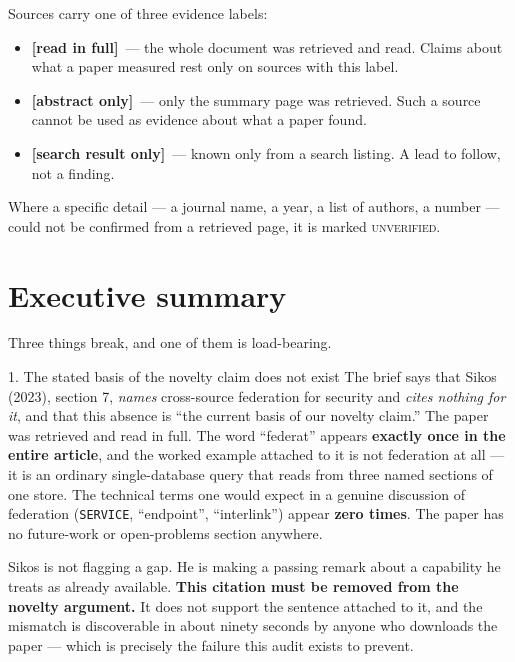 \documentclass[11pt,a4paper]{article}
\newcommand{\readtag}{\textcolor{standing}{\textbf{[read in full]}}}
\newcommand{\abstag}{\textcolor{partial}{\textbf{[abstract only]}}}
\newcommand{\sniptag}{\textcolor{killed}{\textbf{[search result only]}}}
\newcommand{\unver}{\textcolor{killed}{\textsc{unverified}}}
\begin{document}
\vspace{4mm}

Sources carry one of three evidence labels:

\begin{itemize}
\item \readtag\ --- the whole document was retrieved and read. Claims about what a
      paper measured rest only on sources with this label.
\item \abstag\ --- only the summary page was retrieved. Such a source cannot be
      used as evidence about what a paper found.
\item \sniptag\ --- known only from a search listing. A lead to follow, not a finding.
\end{itemize}

Where a specific detail --- a journal name, a year, a list of authors, a number ---
could not be confirmed from a retrieved page, it is marked \unver.

\section{Executive summary}

Three things break, and one of them is load-bearing.

\begin{alertbox}{1. The stated basis of the novelty claim does not exist}
The brief says that Sikos (2023), section 7, \emph{names} cross-source federation
for security and \emph{cites nothing for it}, and that this absence is ``the
current basis of our novelty claim.'' The paper was retrieved and read in full.
The word ``federat'' appears \textbf{exactly once in the entire article}, and the
worked example attached to it is not federation at all --- it is an ordinary
single-database query that reads from three named sections of one store. The
technical terms one would expect in a genuine discussion of federation
(\texttt{SERVICE}, ``endpoint'', ``interlink'') appear \textbf{zero times}. The
paper has no future-work or open-problems section anywhere.

Sikos is not flagging a gap. He is making a passing remark about a capability he
treats as already available. \textbf{This citation must be removed from the
novelty argument.} It does not support the sentence attached to it, and the
mismatch is discoverable in about ninety seconds by anyone who downloads the
paper --- which is precisely the failure this audit exists to prevent.
\end{alertbox}
\end{document}
